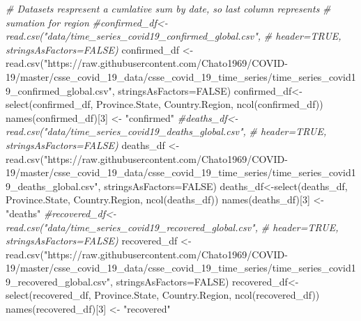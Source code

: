 \documentclass[
]{article}
\newenvironment{Shaded}{\begin{snugshade}}{\end{snugshade}}
\newcommand{\AttributeTok}[1]{\textcolor[rgb]{0.77,0.63,0.00}{#1}}
\newcommand{\CommentTok}[1]{\textcolor[rgb]{0.56,0.35,0.01}{\textit{#1}}}
\newcommand{\ConstantTok}[1]{\textcolor[rgb]{0.00,0.00,0.00}{#1}}
\newcommand{\DecValTok}[1]{\textcolor[rgb]{0.00,0.00,0.81}{#1}}
\newcommand{\FunctionTok}[1]{\textcolor[rgb]{0.00,0.00,0.00}{#1}}
\newcommand{\NormalTok}[1]{#1}
\newcommand{\OtherTok}[1]{\textcolor[rgb]{0.56,0.35,0.01}{#1}}
\newcommand{\StringTok}[1]{\textcolor[rgb]{0.31,0.60,0.02}{#1}}
\begin{document}
\begin{Shaded}
\begin{Highlighting}[]
\CommentTok{\# Datasets respresent a cumlative sum by date, so last column represents }
\CommentTok{\# sumation for region}
\CommentTok{\#confirmed\_df\textless{}{-}read.csv("data/time\_series\_covid19\_confirmed\_global.csv", }
\CommentTok{\#                       header=TRUE, stringsAsFactors=FALSE)}
\NormalTok{confirmed\_df }\OtherTok{\textless{}{-}} \FunctionTok{read.csv}\NormalTok{(}\StringTok{"https://raw.githubusercontent.com/Chato1969/COVID{-}19/master/csse\_covid\_19\_data/csse\_covid\_19\_time\_series/time\_series\_covid19\_confirmed\_global.csv"}\NormalTok{, }\AttributeTok{stringsAsFactors=}\ConstantTok{FALSE}\NormalTok{)}
\NormalTok{confirmed\_df}\OtherTok{\textless{}{-}}\FunctionTok{select}\NormalTok{(confirmed\_df, Province.State, }
\NormalTok{                     Country.Region, }\FunctionTok{ncol}\NormalTok{(confirmed\_df))}
\FunctionTok{names}\NormalTok{(confirmed\_df)[}\DecValTok{3}\NormalTok{] }\OtherTok{\textless{}{-}} \StringTok{"confirmed"}
\CommentTok{\#deaths\_df\textless{}{-}read.csv("data/time\_series\_covid19\_deaths\_global.csv", }
\CommentTok{\#                    header=TRUE, stringsAsFactors=FALSE)}
\NormalTok{deaths\_df }\OtherTok{\textless{}{-}} \FunctionTok{read.csv}\NormalTok{(}\StringTok{"https://raw.githubusercontent.com/Chato1969/COVID{-}19/master/csse\_covid\_19\_data/csse\_covid\_19\_time\_series/time\_series\_covid19\_deaths\_global.csv"}\NormalTok{, }\AttributeTok{stringsAsFactors=}\ConstantTok{FALSE}\NormalTok{)}
\NormalTok{deaths\_df}\OtherTok{\textless{}{-}}\FunctionTok{select}\NormalTok{(deaths\_df, Province.State, }
\NormalTok{                  Country.Region, }\FunctionTok{ncol}\NormalTok{(deaths\_df))}
\FunctionTok{names}\NormalTok{(deaths\_df)[}\DecValTok{3}\NormalTok{] }\OtherTok{\textless{}{-}} \StringTok{"deaths"}
\CommentTok{\#recovered\_df\textless{}{-}read.csv("data/time\_series\_covid19\_recovered\_global.csv", }
\CommentTok{\#                       header=TRUE, stringsAsFactors=FALSE)}
\NormalTok{recovered\_df }\OtherTok{\textless{}{-}} \FunctionTok{read.csv}\NormalTok{(}\StringTok{"https://raw.githubusercontent.com/Chato1969/COVID{-}19/master/csse\_covid\_19\_data/csse\_covid\_19\_time\_series/time\_series\_covid19\_recovered\_global.csv"}\NormalTok{, }\AttributeTok{stringsAsFactors=}\ConstantTok{FALSE}\NormalTok{)}
\NormalTok{recovered\_df}\OtherTok{\textless{}{-}}\FunctionTok{select}\NormalTok{(recovered\_df, Province.State, }
\NormalTok{                     Country.Region, }\FunctionTok{ncol}\NormalTok{(recovered\_df))}
\FunctionTok{names}\NormalTok{(recovered\_df)[}\DecValTok{3}\NormalTok{] }\OtherTok{\textless{}{-}} \StringTok{"recovered"}


\end{Highlighting}
\end{Shaded}
\end{document}
